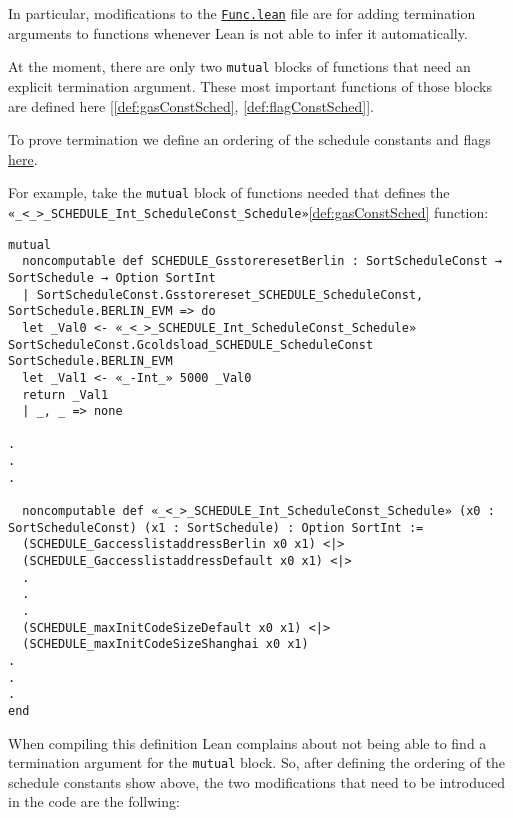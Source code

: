 In particular, modifications to the
\href{https://runtimeverification.github.io/evm-equivalence/docs/EvmEquivalence/KEVM2Lean/Func.html}{\texttt{Func.lean}}
file are for adding termination arguments to functions whenever Lean is not able
to infer it automatically.

At the moment, there are only two \texttt{mutual} blocks of functions that need
an explicit termination argument. These most important functions of those blocks
are defined here [\ref{def:gasConstSched}, \ref{def:flagConstSched}].

To prove termination we define an ordering of the schedule constants and flags
\href{https://runtimeverification.github.io/evm-equivalence/docs/EvmEquivalence/KEVM2Lean/ScheduleOrdering.html}{here}.


For example, take the \texttt{mutual} block of functions needed that defines the \texttt{«_<_>_SCHEDULE_Int_ScheduleConst_Schedule»}\ref{def:gasConstSched} function:

\begin{verbatim}
mutual
  noncomputable def SCHEDULE_GsstoreresetBerlin : SortScheduleConst → SortSchedule → Option SortInt
  | SortScheduleConst.Gsstorereset_SCHEDULE_ScheduleConst, SortSchedule.BERLIN_EVM => do
  let _Val0 <- «_<_>_SCHEDULE_Int_ScheduleConst_Schedule» SortScheduleConst.Gcoldsload_SCHEDULE_ScheduleConst SortSchedule.BERLIN_EVM
  let _Val1 <- «_-Int_» 5000 _Val0
  return _Val1
  | _, _ => none

.
.
.

  noncomputable def «_<_>_SCHEDULE_Int_ScheduleConst_Schedule» (x0 : SortScheduleConst) (x1 : SortSchedule) : Option SortInt :=
  (SCHEDULE_GaccesslistaddressBerlin x0 x1) <|>
  (SCHEDULE_GaccesslistaddressDefault x0 x1) <|>
  .
  .
  .
  (SCHEDULE_maxInitCodeSizeDefault x0 x1) <|>
  (SCHEDULE_maxInitCodeSizeShanghai x0 x1)
.
.
.
end
\end{verbatim}

When compiling this definition Lean complains about not being able to find a termination argument for the \texttt{mutual} block.
So, after defining the ordering of the schedule constants show above, the two modifications that need to be introduced in the code are the follwing:

